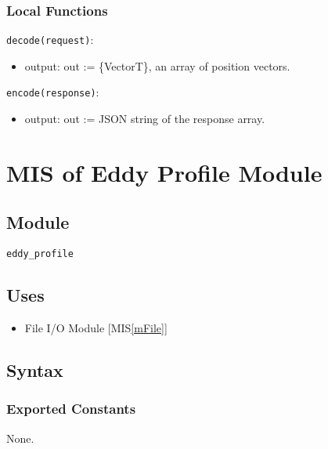 \documentclass[12pt, titlepage]{article}
\begin{document}

\subsubsection{Local Functions}


\noindent \texttt{decode(request)}:
\begin{itemize}
\item output: out := \{VectorT\}, an array of position vectors.
\end{itemize}

\noindent \texttt{encode(response)}:
\begin{itemize}
  \item output: out := JSON string of the response array.
\end{itemize}

\newpage
\section{MIS of Eddy Profile Module} \label{mProf} 

\subsection{Module}
\texttt{eddy\_profile}

\subsection{Uses}
\begin{itemize}
\item File I/O Module [MIS\ref{mFile}]
\end{itemize}

\subsection{Syntax}

\subsubsection{Exported Constants}
None.
\end{document}
